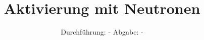 

\subject{V702}
\title{Aktivierung mit Neutronen}
\date{%
  Durchführung: -
  \hspace{3em}
  Abgabe: -
}



\maketitle
\thispagestyle{empty}
\tableofcontents
\newpage






\printbibliography{}


